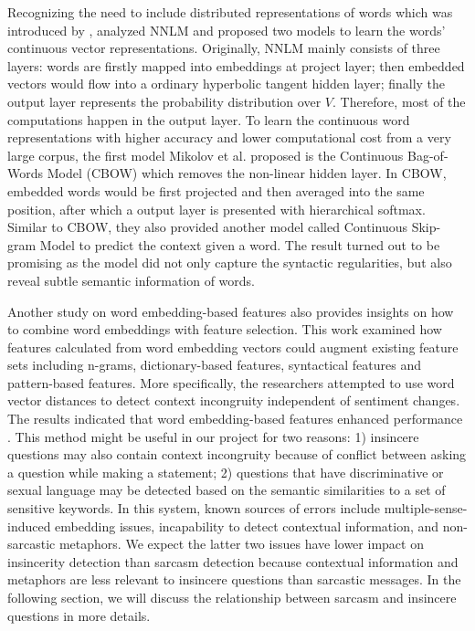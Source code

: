 \documentclass[12pt]{diazessay} %
\begin{document}
Recognizing the need to include distributed representations of words which was introduced by \citep{hinton1984distributed}, \citep{mikolov2013efficient} analyzed NNLM and proposed two models to learn the words' continuous vector representations. Originally, NNLM mainly consists of three layers: words are firstly mapped into embeddings at project layer; then embedded vectors would flow into a ordinary hyperbolic tangent hidden layer; finally the output layer represents the probability distribution over $V$. Therefore, most of the computations happen in the output layer. To learn the continuous word representations with higher accuracy and lower computational cost from a very large corpus, the first model Mikolov et al. proposed is the Continuous Bag-of-Words Model (CBOW) which removes the non-linear hidden layer. In CBOW, embedded words would be first projected and then averaged into the same position, after which a output layer is presented with hierarchical softmax. Similar to CBOW, they also provided another model called Continuous Skip-gram Model to predict the context given a word. The result turned out to be promising as the model did not only capture the syntactic regularities, but also reveal subtle semantic information of words.

Another study on word embedding-based features \citep{joshi2016} also provides insights on how to combine word embeddings with feature selection. This work examined how features calculated from word embedding vectors could augment existing feature sets including n-grams, dictionary-based features, syntactical features and pattern-based features. More specifically, the researchers attempted to use word vector distances to detect context incongruity independent of sentiment changes. The results indicated that word embedding-based features enhanced performance \citep{joshi2016}. This method might be useful in our project for two reasons: 1) insincere questions may also contain context incongruity because of conflict between asking a question while making a statement; 2) questions that have discriminative or sexual language may be detected based on the semantic similarities to a set of sensitive keywords.  In this system, known sources of errors include multiple-sense-induced embedding issues, incapability to detect contextual information, and non-sarcastic metaphors\citep{joshi2016}. We expect the latter two issues have lower impact on insincerity detection than sarcasm detection because contextual information and metaphors are less relevant to insincere questions than sarcastic messages. In the following section, we will discuss the relationship between sarcasm and insincere questions in more details. 
\end{document}
